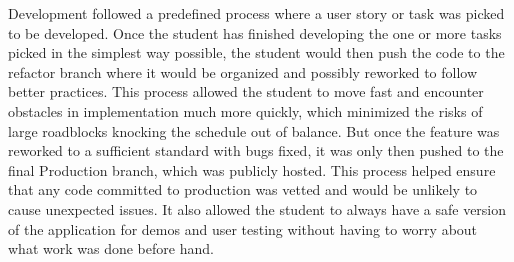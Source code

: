 Development followed a predefined process where a user story or task was picked to be developed. Once the student has finished developing the one or more tasks picked in the simplest way possible, the student would then push the code to the refactor branch where it would be organized and possibly reworked to follow better practices. This process allowed the student to move fast and encounter obstacles in implementation much more quickly, which minimized the risks of large roadblocks knocking the schedule out of balance. But once the feature was reworked to a sufficient standard with bugs fixed, it was only then pushed to the final Production branch, which was publicly hosted.
This process helped ensure that any code committed to production was vetted and would be unlikely to cause unexpected issues. It also allowed the student to always have a safe version of the application for demos and user testing without having to worry about what work was done before hand.

